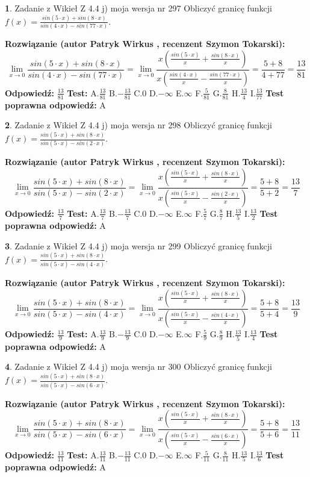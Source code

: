 \documentclass[12pt, a4paper]{article}
\theoremstyle{definition} %
\newtheorem{zad}{}
\newcommand{\zadStart}[1]{\begin{zad}#1\newline}
\newcommand{\zadStop}{\end{zad}}
\newcommand{\rozwStart}[2]{\noindent \textbf{Rozwiązanie (autor #1 , recenzent #2): }\newline}
\newcommand{\rozwStop}{\newline}
\newcommand{\odpStart}{\noindent \textbf{Odpowiedź:}\newline}
\newcommand{\odpStop}{\newline}
\newcommand{\testStart}{\noindent \textbf{Test:}\newline}
\newcommand{\testStop}{\newline}
\newcommand{\kluczStart}{\noindent \textbf{Test poprawna odpowiedź:}\newline}
\newcommand{\kluczStop}{\newline}
\begin{document}
\zadStart{Zadanie z Wikieł Z 4.4 j) moja wersja nr 297}
Obliczyć granicę funkcji $f(x)=\frac{sin(5\cdot x) +sin(8\cdot x)}{sin(4\cdot x) -sin(77\cdot x)}$.
\zadStop
\rozwStart{Patryk Wirkus}{Szymon Tokarski}
$$\lim\limits_{x\to 0}\frac{sin(5\cdot x) +sin(8\cdot x)}{sin(4\cdot x) -sin(77\cdot x)}=\lim\limits_{x\to 0}\frac{x(\frac{sin(5\cdot x)}{x}+\frac{sin(8\cdot x)}{x})}{x(\frac{sin(4\cdot x)}{x}-\frac{sin(77\cdot x)}{x})}=\frac{5+8}{4+77} = \frac{13}{81}$$
\rozwStop
\odpStart
$\frac{13}{81}$
\odpStop
\testStart
A.$\frac{13}{81}$
B.$-\frac{13}{81}$
C.$0$
D.$-\infty$
E.$\infty$
F.$\frac{5}{81}$
G.$\frac{8}{81}$
H.$\frac{13}{4}$
I.$\frac{13}{77}$
\testStop
\kluczStart
A
\kluczStop



\zadStart{Zadanie z Wikieł Z 4.4 j) moja wersja nr 298}
Obliczyć granicę funkcji $f(x)=\frac{sin(5\cdot x) +sin(8\cdot x)}{sin(5\cdot x) -sin(2\cdot x)}$.
\zadStop
\rozwStart{Patryk Wirkus}{Szymon Tokarski}
$$\lim\limits_{x\to 0}\frac{sin(5\cdot x) +sin(8\cdot x)}{sin(5\cdot x) -sin(2\cdot x)}=\lim\limits_{x\to 0}\frac{x(\frac{sin(5\cdot x)}{x}+\frac{sin(8\cdot x)}{x})}{x(\frac{sin(5\cdot x)}{x}-\frac{sin(2\cdot x)}{x})}=\frac{5+8}{5+2} = \frac{13}{7}$$
\rozwStop
\odpStart
$\frac{13}{7}$
\odpStop
\testStart
A.$\frac{13}{7}$
B.$-\frac{13}{7}$
C.$0$
D.$-\infty$
E.$\infty$
F.$\frac{5}{7}$
G.$\frac{8}{7}$
H.$\frac{13}{5}$
I.$\frac{13}{2}$
\testStop
\kluczStart
A
\kluczStop



\zadStart{Zadanie z Wikieł Z 4.4 j) moja wersja nr 299}
Obliczyć granicę funkcji $f(x)=\frac{sin(5\cdot x) +sin(8\cdot x)}{sin(5\cdot x) -sin(4\cdot x)}$.
\zadStop
\rozwStart{Patryk Wirkus}{Szymon Tokarski}
$$\lim\limits_{x\to 0}\frac{sin(5\cdot x) +sin(8\cdot x)}{sin(5\cdot x) -sin(4\cdot x)}=\lim\limits_{x\to 0}\frac{x(\frac{sin(5\cdot x)}{x}+\frac{sin(8\cdot x)}{x})}{x(\frac{sin(5\cdot x)}{x}-\frac{sin(4\cdot x)}{x})}=\frac{5+8}{5+4} = \frac{13}{9}$$
\rozwStop
\odpStart
$\frac{13}{9}$
\odpStop
\testStart
A.$\frac{13}{9}$
B.$-\frac{13}{9}$
C.$0$
D.$-\infty$
E.$\infty$
F.$\frac{5}{9}$
G.$\frac{8}{9}$
H.$\frac{13}{5}$
I.$\frac{13}{4}$
\testStop
\kluczStart
A
\kluczStop



\zadStart{Zadanie z Wikieł Z 4.4 j) moja wersja nr 300}
Obliczyć granicę funkcji $f(x)=\frac{sin(5\cdot x) +sin(8\cdot x)}{sin(5\cdot x) -sin(6\cdot x)}$.
\zadStop
\rozwStart{Patryk Wirkus}{Szymon Tokarski}
$$\lim\limits_{x\to 0}\frac{sin(5\cdot x) +sin(8\cdot x)}{sin(5\cdot x) -sin(6\cdot x)}=\lim\limits_{x\to 0}\frac{x(\frac{sin(5\cdot x)}{x}+\frac{sin(8\cdot x)}{x})}{x(\frac{sin(5\cdot x)}{x}-\frac{sin(6\cdot x)}{x})}=\frac{5+8}{5+6} = \frac{13}{11}$$
\rozwStop
\odpStart
$\frac{13}{11}$
\odpStop
\testStart
A.$\frac{13}{11}$
B.$-\frac{13}{11}$
C.$0$
D.$-\infty$
E.$\infty$
F.$\frac{5}{11}$
G.$\frac{8}{11}$
H.$\frac{13}{5}$
I.$\frac{13}{6}$
\testStop
\kluczStart
A
\kluczStop
\end{document}
